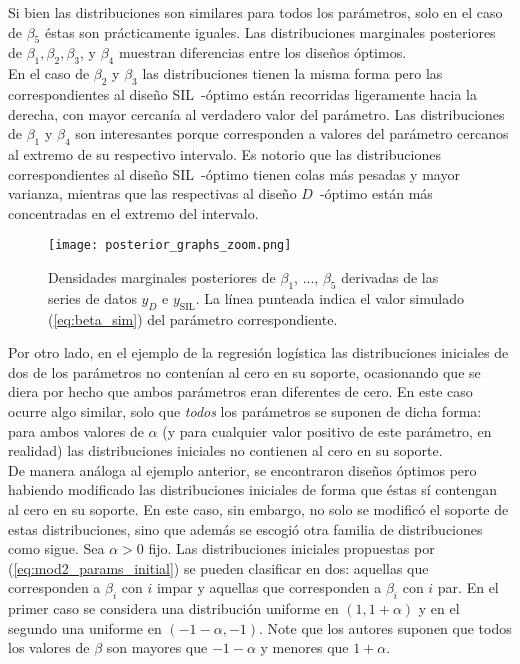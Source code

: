 Si bien las distribuciones son similares para todos los parámetros, solo en el caso de $\beta_5$ éstas son prácticamente iguales. Las distribuciones marginales posteriores de $\beta_1, \beta_2, \beta_3$, y $\beta_4$ muestran diferencias entre los diseños óptimos. \\


En el caso de $\beta_2$ y $\beta_3$ las distribuciones tienen la misma forma pero las correspondientes al diseño SIL~-óptimo están recorridas ligeramente hacia la derecha, con mayor cercanía al verdadero valor del parámetro. Las distribuciones de $\beta_1$ y $\beta_4$ son interesantes porque corresponden a valores del parámetro cercanos al extremo de su respectivo intervalo. Es notorio que las distribuciones correspondientes al diseño SIL~-óptimo tienen colas más pesadas y mayor varianza, mientras que las respectivas al diseño $D$~-óptimo están más concentradas en el extremo del intervalo.  \\



\begin{figure}[h]
	\centering
    \texttt{[image: posterior\_graphs\_zoom.png]}
    \caption{Densidades marginales posteriores de $\beta_1$, ..., $\beta_5$ derivadas de las series de datos $y_D$ e $y_{\text{SIL}}$. La línea punteada indica el valor simulado (\ref{eq:beta_sim}) del parámetro correspondiente.}
    \label{fig:posterior_beta}
\end{figure}



Por otro lado, en el ejemplo de la regresión logística las distribuciones iniciales de dos de los parámetros no contenían al cero en su soporte, ocasionando que se diera por hecho que ambos parámetros eran diferentes de cero. En este caso ocurre algo similar, solo que \textit{todos} los parámetros se suponen de dicha forma: para ambos valores de $\alpha$ (y para cualquier valor positivo de este parámetro, en realidad) las distribuciones iniciales no contienen al cero en su soporte. \\


De manera análoga al ejemplo anterior, se encontraron diseños óptimos pero habiendo modificado las distribuciones iniciales de forma que éstas sí contengan al cero en su soporte. En este caso, sin embargo, no solo se modificó el soporte de estas distribuciones, sino que además se escogió otra familia de distribuciones como sigue. Sea $\alpha > 0$ fijo. Las distribuciones iniciales propuestas por \cite{Woods_etal} (\ref{eq:mod2_params_initial}) se pueden clasificar en dos: aquellas que corresponden a $\beta_i$ con $i$ impar y aquellas que corresponden a $\beta_i$ con $i$ par. En el primer caso se considera una distribución uniforme en $(1, 1 + \alpha)$ y en el segundo una uniforme en $(-1 - \alpha, -1)$. Note que los autores suponen que todos los valores de $\beta$ son mayores que $-1 - \alpha$ y menores que $1 + \alpha$. \\


